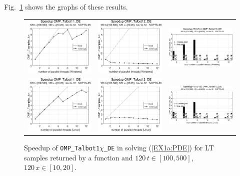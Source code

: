\documentclass[a4paper,10pt]{report}%
\begin{document}
Fig.~\ref{PAR_EX1a_speedup_fun} shows the graphs of these results.
\begin{figure}[htb]
\centering
\begin{tabular}{ccc} %
\includegraphics[height=0.2\textwidth]{./FIGS/EX1a/EX1a_fun_speedup_11_Windows.eps} &
\includegraphics[height=0.2\textwidth]{./FIGS/EX1a/EX1a_fun_speedup_12_Windows.eps} &
\includegraphics[height=0.2\textwidth,keepaspectratio=true]{./FIGS/EX1a/EX1a_fun_speedup_13_Windows.eps} \\
\includegraphics[height=0.2\textwidth]{./FIGS/EX1a/EX1a_fun_speedup_11_Linux.eps} &
\includegraphics[height=0.2\textwidth]{./FIGS/EX1a/EX1a_fun_speedup_12_Linux.eps} &
\includegraphics[height=0.2\textwidth,keepaspectratio=true]{./FIGS/EX1a/EX1a_fun_speedup_13_Linux.eps}
\end{tabular}
\caption{\small Speedup of {\tt OMP\_Talbot1$\chi$\_DE} in solving (\ref{EX1a:PDE}) for LT samples
returned by a function and $120\,t\in[100,500]$, $120\,x\in[10,20]$.}
\label{PAR_EX1a_speedup_fun}
\end{figure}
\end{document}
